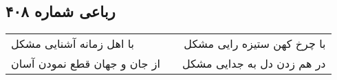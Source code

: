 \begin{center}
\section*{رباعی شماره ۴۰۸}
\label{sec:sh408}
\begin{longtable}{l p{0.5cm} r}
با اهل زمانه آشنایی مشکل
&&
با چرخ کهن ستیزه رایی مشکل
\\
از جان و جهان قطع نمودن آسان
&&
در هم زدن دل به جدایی مشکل
\\
\end{longtable}
\end{center}

